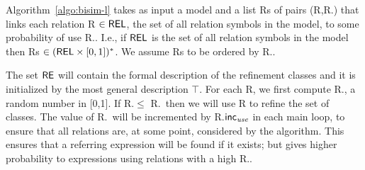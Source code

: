 


Algorithm~\ref{algo:bisim-l} takes as input a model and a list Rs of pairs (R,R.\puse) that links each relation R $\in \textsf{REL}$, the set of all relation symbols in the model,  to some probability of use R.\puse. 
I.e., if $\textsf{REL}$ is the set of all relation symbols in the model then Rs $\in (\textsf{REL} \times [0,1])^*$. We assume Rs to be ordered by R.\puse. 

The set $\textsf{RE}$ will contain the formal description of the refinement classes and it is initialized by the most general description $\top$.  
For each R, we first compute R.\randomuse, a random number in [0,1].  If R.\randomuse $\le$ R.\puse\ then we will use R to refine the set of classes.  The value of R.\puse\ will be incremented by R.$\textsf{inc}_\emph{use}$ in each main loop, to ensure that all relations are, at some point, considered by the algorithm.  This ensures that a referring expression will be found if it exists; but gives higher probability to expressions using relations with a high R.\puse. 

